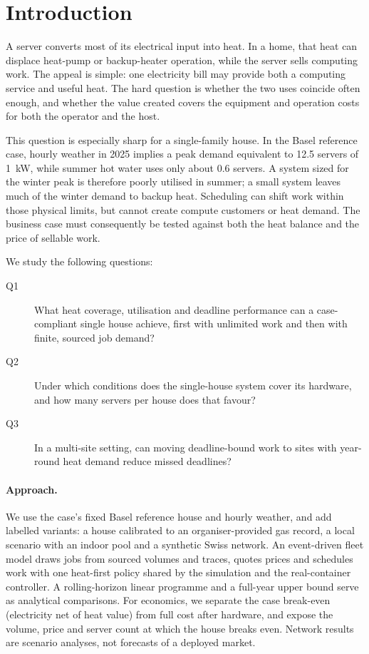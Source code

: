 \section{Introduction}
\label{sec:intro}

A server converts most of its electrical input into heat. In a home, that heat can displace
heat-pump or backup-heater operation, while the server sells computing work. The appeal is simple:
one electricity bill may provide both a computing service and useful heat. The hard question is
whether the two uses coincide often enough, and whether the value created covers the equipment and
operation costs for both the operator and the host.

This question is especially sharp for a single-family house. In the Basel reference case, hourly
weather in 2025 implies a peak demand equivalent to 12.5 servers of 1~kW, while summer hot water
uses only about 0.6 servers. A system sized for the winter peak is therefore poorly utilised in
summer; a small system leaves much of the winter demand to backup heat. Scheduling can shift work
within those physical limits, but cannot create compute customers or heat demand. The business
case must consequently be tested against both the heat balance and the price of sellable work.

We study the following questions:
\begin{description}
  \item[Q1] What heat coverage, utilisation and deadline performance can a case-compliant single
    house achieve, first with unlimited work and then with finite, sourced job demand?
  \item[Q2] Under which conditions does the single-house system cover its hardware, and how many
    servers per house does that favour?
  \item[Q3] In a multi-site setting, can moving deadline-bound work to sites with year-round heat
    demand reduce missed deadlines?
\end{description}

\paragraph{Approach.} We use the case's fixed Basel reference house and hourly weather, and add
labelled variants: a house calibrated to an organiser-provided gas record, a local scenario with an
indoor pool and a synthetic Swiss network. An event-driven fleet model draws jobs from sourced
volumes and traces, quotes prices and schedules work with one heat-first policy shared by the
simulation and the real-container controller. A rolling-horizon linear programme and a full-year
upper bound serve as analytical comparisons. For economics, we separate the case break-even
(electricity net of heat value) from full cost after hardware, and expose the volume, price and
server count at which the house breaks even. Network results are scenario analyses, not forecasts
of a deployed market.

